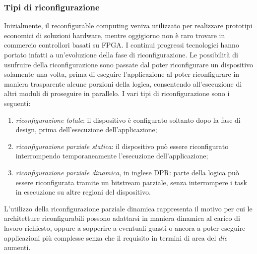 \subsubsection{Tipi di riconfigurazione}
Inizialmente, il reconfigurable computing veniva utilizzato per realizzare prototipi
economici di soluzioni hardware, mentre oggigiorno non \`e raro trovare in commercio
controllori basati su \ac{FPGA}. I continui progressi tecnologici hanno portato infatti
a un'evoluzione della fase di riconfigurazione. Le possibilit\`a di usufruire della
riconfigurazione sono passate dal poter riconfigurare un dispositivo solamente una volta,
prima di eseguire l'applicazione al poter riconfigurare in maniera trasparente alcune porzioni
della logica, consentendo all'esecuzione di altri moduli di proseguire in parallelo.
I vari tipi di riconfigurazione sono i seguenti:
\begin{enumerate}
 \item \emph{riconfigurazione totale}: il dispositivo è configurato soltanto
dopo la fase di design, prima dell'esecuzione dell'applicazione;
 \item \emph{riconfigurazione parziale statica}: il dispositivo può essere riconfigurato
interrompendo temporaneamente l'esecuzione dell'applicazione;
 \item \emph{riconfigurazione parziale dinamica}, in inglese \ac{DPR}: parte della logica
può essere riconfigurata tramite un bitstream parziale, senza interrompere i task in
esecuzione su altre regioni del dispositivo.
\end{enumerate}
L'utilizzo della riconfigurazione parziale dinamica rappresenta il motivo per cui le
architetture riconfigurabili possono adattarsi in maniera dinamica al carico di lavoro richiesto,
oppure a sopperire a eventuali guasti o ancora a poter eseguire applicazioni pi\`u complesse
senza che il requisito in termini di area del \emph{die} aumenti.

